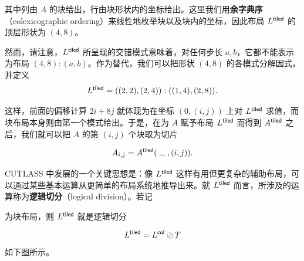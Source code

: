 \bigskip

\noindent 其中列由 $A$ 的块给出，行由块形状内的坐标给出。这里我们用{\bf 余字典序}（colexicographic ordering）来线性地枚举块以及块内的坐标，因此布局 $L^{\mathsf{tiled}}$ 的顶层形状为 $(4, 8)$。

然而，请注意，$L^{\mathsf{tiled}}$ 所呈现的交错模式意味着，对任何步长 $a,b$，它都不能表示为布局 $(4,8):(a,b)$。作为替代，我们可以把形状 $(4,8)$ 的各模式分解因式，并定义
\[ L^{\mathsf{tiled}} = ((2,2),(2,4)):((1,4),(2,8)). \]

\noindent 这样，前面的偏移计算 $2i + 8j$ 就体现为在坐标 $(0, (i,j))$ 上对 $L^{\mathsf{tiled}}$ 求值，而块布局本身则由第一个模式给出。于是，在为 $A$ 赋予布局 $L^{\mathsf{tiled}}$ 而得到 $A^{\mathsf{tiled}}$ 之后，我们就可以把 $A$ 的第 $(i,j)$ 个块取为切片

\[ A_{i,j} = A^\tiled(\; \rule{.7em}{0.4pt} \; , (i,j)). \]

CUTLASS 中发展的一个关键思想是：像 $L^{\mathsf{tiled}}$ 这样有用但更复杂的辅助布局，可以通过某些基本运算从更简单的布局系统地推导出来。就 $L^{\mathsf{tiled}}$ 而言，所涉及的运算称为{\bf 逻辑切分}（logical division）。若记
\\

\begin{centering}


\end{centering}

\bigskip

\noindent 为块布局，则 $L^{\mathsf{tiled}}$ 就是逻辑切分

\[
L^{\mathsf{tiled}} = L^{\mathsf{col}} \oslash T
\]
如下图所示。\\

